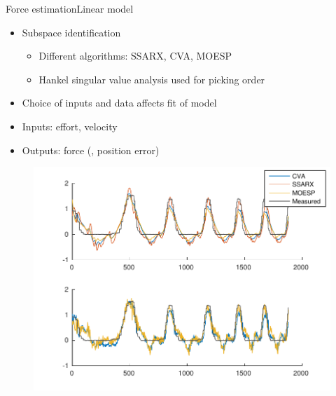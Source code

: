 \begin{frame}{Force estimation}{Linear model}
\begin{itemize}
  \item Subspace identification
	\begin{itemize}
	\item Different algorithms: SSARX, CVA, MOESP
	\item Hankel singular value analysis used for picking order
	\end{itemize}
  \item Choice of inputs and data affects fit of model
  \item Inputs: effort, velocity 
  \item Outputs: force (, position error)
\end{itemize}
	
	\begin{figure}
	\centering
	\includegraphics[width=\linewidth]{Billeder/sscomparison1-eps-converted-to.pdf}
	\end{figure}
\end{frame}

